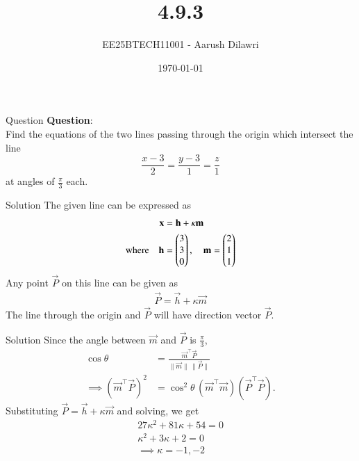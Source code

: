\documentclass{beamer}
\title{4.9.3}
\date{\today}
\author{EE25BTECH11001 - Aarush Dilawri}
\begin{document}
\frame{\titlepage}


\begin{frame}{Question}
\textbf{Question}:\\
Find the equations of the two lines passing through the origin which intersect the line 
\[
\frac{x-3}{2} = \frac{y-3}{1} = \frac{z}{1}
\]
at angles of $\tfrac{\pi}{3}$ each.
\end{frame}

\begin{frame}{Solution}
The given line can be expressed as
\begin{align}
    \mathbf{x} &= \mathbf{h} + \kappa\mathbf{m}\\
    \text{where}\quad \mathbf{h} &= \begin{pmatrix}3\\3\\0\end{pmatrix}, \quad \mathbf{m} = \begin{pmatrix}2\\1\\1\end{pmatrix}
\end{align}
Any point $\vec{P}$ on this line can be given as 
\begin{align}
    \vec{P} = \vec{h} + \kappa\vec{m}
\end{align}
The line through the origin and $\vec{P}$ will have direction vector $\vec{P}$.
\end{frame}

\begin{frame}{Solution}
Since the angle between $\vec{m}$ and $\vec{P}$ is $\tfrac{\pi}{3}$,
\begin{align}
\cos \theta &= \frac{\vec{m}^\top \vec{P}}{\|\vec{m}\| \,\|\vec{P}\|} \\
\implies \left( \vec{m}^\top \vec{P} \right)^2 &= \cos^2\theta\,(\vec{m}^\top\vec{m})(\vec{P}^\top\vec{P}).
\end{align}
Substituting $\vec{P} = \vec{h} + \kappa\vec{m}$ and solving, we get
\begin{align}
    27\kappa^2 + 81\kappa + 54 = 0\\
    \kappa^2 + 3\kappa + 2 =0\\
    \implies \kappa = -1,-2
\end{align}
\end{frame}
\end{document}
